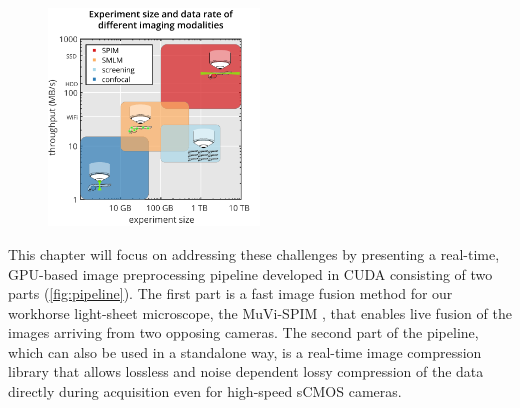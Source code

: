   \begin{figure}[btp]
    \centering
    \includegraphics[page=1,width=0.5\textwidth]{comparison_with_pictograms}
    \label{fig:sizes}
  \end{figure}


  This chapter will focus on addressing these challenges by presenting a real-time, GPU-based image preprocessing pipeline developed in CUDA \cite{nickolls_scalable_2008} consisting of two parts (\autoref{fig:pipeline}).
  The first part is a fast image fusion method for our workhorse light-sheet microscope, the MuVi-SPIM \cite{krzic_multiview_2012}, that enables live fusion of the images arriving from two opposing cameras.
  The second part of the pipeline, which can also be used in a standalone way, is a real-time image compression library that allows lossless and noise dependent lossy compression of the data directly during acquisition even for high-speed sCMOS cameras.


